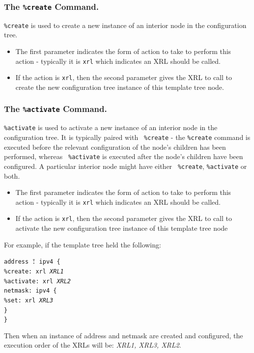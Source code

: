 \documentclass[11pt]{article}
\begin{document}
\subsubsection{The {\tt \%create} Command.}
{\tt \%create} is used to create a new instance of an interior node in
the configuration tree.  
\begin{itemize}
\item The first parameter indicates the form of
action to take to perform this action - typically it is {\tt xrl}
which indicates an XRL should be called.  
\item If the action is {\tt xrl}, then the second parameter gives the XRL to
call to create the new configuration tree instance of this template
tree node.
\end{itemize}

\subsubsection{The {\tt \%activate} Command.}
{\tt \%activate} is used to activate a new instance of an interior
node in the configuration tree.  It is typically paired with {\tt
\%create} - the {\tt \%create} command is executed before the relevant
configuration of the node's children has been performed, whereas {\tt
\%activate} is executed after the node's children have been
configured.  A particular interior node might have either {\tt
\%create}, {\tt \%activate} or both.
\begin{itemize}
\item The first parameter indicates the form of action to take to perform
this action - typically it is {\tt xrl} which indicates an XRL should
be called.
\item If the action is {\tt xrl}, then the second parameter gives the XRL to
call to activate the new configuration tree instance of this template
tree node
\end{itemize}

For example, if the template tree held the following:
\begin{tabbing}
\tt addr\=\tt ess \=\tt@: ipv4 \{\\
    \>\tt\%create: xrl {\it XRL1}\\
    \>\tt\%activate: xrl {\it XRL2}\\
    \>\tt netmask: ipv4 \{\\
        \>\>\tt\%set: xrl {\it XRL3}\\
    \>\tt\}\\
\tt\}
\end{tabbing}
Then when an instance of address and netmask are created and
configured, the execution order of the XRLs will be: {\it XRL1, XRL3, XRL2}.
\end{document}
